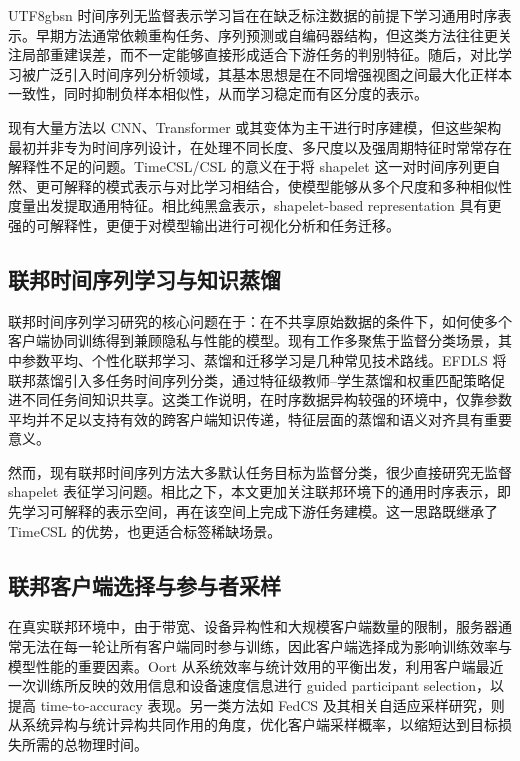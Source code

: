 \documentclass{article}
\begin{document}
\begin{CJK*}{UTF8}{gbsn}
时间序列无监督表示学习旨在在缺乏标注数据的前提下学习通用时序表示。早期方法通常依赖重构任务、序列预测或自编码器结构，但这类方法往往更关注局部重建误差，而不一定能够直接形成适合下游任务的判别特征。随后，对比学习被广泛引入时间序列分析领域，其基本思想是在不同增强视图之间最大化正样本一致性，同时抑制负样本相似性，从而学习稳定而有区分度的表示。

现有大量方法以 CNN、Transformer 或其变体为主干进行时序建模，但这些架构最初并非专为时间序列设计，在处理不同长度、多尺度以及强周期特征时常常存在解释性不足的问题。TimeCSL/CSL 的意义在于将 shapelet 这一对时间序列更自然、更可解释的模式表示与对比学习相结合，使模型能够从多个尺度和多种相似性度量出发提取通用特征\cite{timescsl}。相比纯黑盒表示，shapelet-based representation 具有更强的可解释性，更便于对模型输出进行可视化分析和任务迁移。

\subsection{联邦时间序列学习与知识蒸馏}

联邦时间序列学习研究的核心问题在于：在不共享原始数据的条件下，如何使多个客户端协同训练得到兼顾隐私与性能的模型。现有工作多聚焦于监督分类场景，其中参数平均、个性化联邦学习、蒸馏和迁移学习是几种常见技术路线。EFDLS 将联邦蒸馏引入多任务时间序列分类，通过特征级教师--学生蒸馏和权重匹配策略促进不同任务间知识共享\cite{efdls}。这类工作说明，在时序数据异构较强的环境中，仅靠参数平均并不足以支持有效的跨客户端知识传递，特征层面的蒸馏和语义对齐具有重要意义。

然而，现有联邦时间序列方法大多默认任务目标为监督分类，很少直接研究无监督 shapelet 表征学习问题。相比之下，本文更加关注联邦环境下的通用时序表示，即先学习可解释的表示空间，再在该空间上完成下游任务建模。这一思路既继承了 TimeCSL 的优势，也更适合标签稀缺场景。

\subsection{联邦客户端选择与参与者采样}

在真实联邦环境中，由于带宽、设备异构性和大规模客户端数量的限制，服务器通常无法在每一轮让所有客户端同时参与训练，因此客户端选择成为影响训练效率与模型性能的重要因素。Oort 从系统效率与统计效用的平衡出发，利用客户端最近一次训练所反映的效用信息和设备速度信息进行 guided participant selection，以提高 time-to-accuracy 表现\cite{oort}。另一类方法如 FedCS 及其相关自适应采样研究，则从系统异构与统计异构共同作用的角度，优化客户端采样概率，以缩短达到目标损失所需的总物理时间\cite{fedcsadaptive}。


\end{CJK*}
\end{document}
